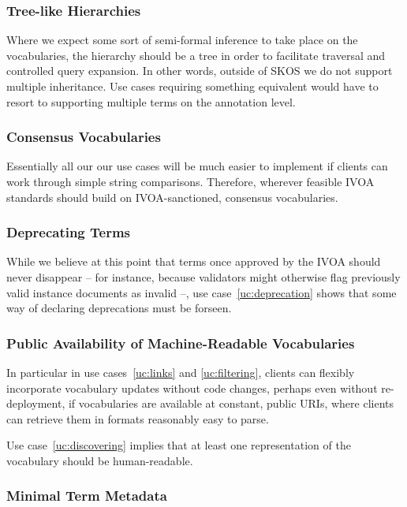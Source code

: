 \documentclass[11pt,a4paper]{ivoa}
\begin{document}
\subsubsection{Tree-like Hierarchies}
\label{req:tree}

Where we expect some sort of semi-formal inference to take place on the
vocabularies, the hierarchy should be a tree in order to facilitate
traversal and controlled query expansion.  In other words, outside of
SKOS we do not support multiple inheritance.  Use cases requiring
something equivalent would have to resort to supporting multiple terms 
on the annotation level.

\subsubsection{Consensus Vocabularies}
\label{req:consensus}

Essentially all our our use cases will be much easier to implement if
clients can work through simple string comparisons.  Therefore,
wherever feasible IVOA standards should build on IVOA-sanctioned,
consensus vocabularies.

\subsubsection{Deprecating Terms}
\label{req:deprecating}

While we believe at this point that terms once approved by the IVOA
should never disappear -- for instance, because validators might
otherwise flag previously valid instance documents as invalid --, use
case~\ref{uc:deprecation} shows that some way of declaring
deprecations must be forseen.

\subsubsection{Public Availability of Machine-Readable Vocabularies}
\label{req:machine}

In particular in use cases~\ref{uc:links} and \ref{uc:filtering},
clients can flexibly incorporate vocabulary updates without code
changes, perhaps even without re-deployment, if vocabularies are
available at constant, public URIs, where clients can retrieve them in
formats reasonably easy to parse.

Use case~\ref{uc:discovering} implies that at least one representation
of the vocabulary should be human-readable.

\subsubsection{Minimal Term Metadata}
\label{req:mtm}
\end{document}
